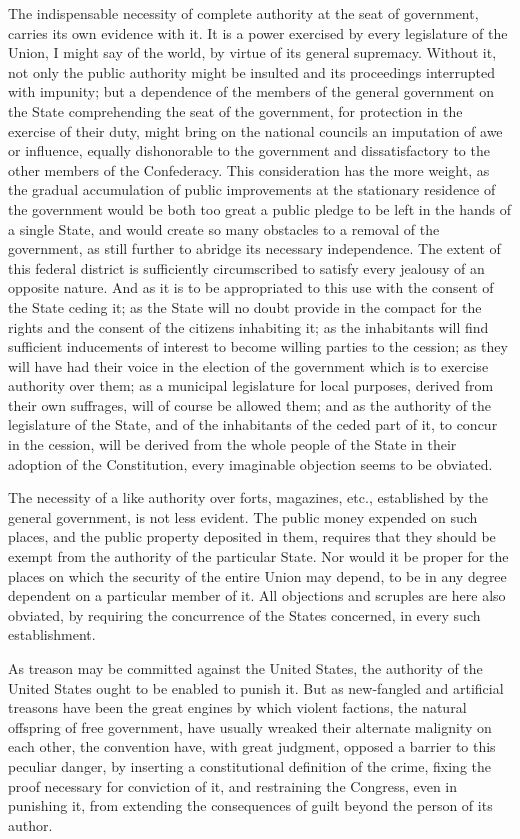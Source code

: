 The indispensable necessity of complete authority at the seat of government, carries its own evidence with it. 
It is a power exercised by every legislature of the Union, I might say of the world, by virtue of its general supremacy. 
Without it, not only the public authority might be insulted and its proceedings interrupted with impunity; but a dependence of the members of the general government on the State comprehending the seat of the government, for protection in the exercise of their duty, might bring on the national councils an imputation of awe or influence, equally dishonorable to the government and dissatisfactory to the other members of the Confederacy. 
This consideration has the more weight, as the gradual accumulation of public improvements at the stationary residence of the government would be both too great a public pledge to be left in the hands of a single State, and would create so many obstacles to a removal of the government, as still further to abridge its necessary independence. 
The extent of this federal district is sufficiently circumscribed to satisfy every jealousy of an opposite nature. 
And as it is to be appropriated to this use with the consent of the State ceding it; as the State will no doubt provide in the compact for the rights and the consent of the citizens inhabiting it; as the inhabitants will find sufficient inducements of interest to become willing parties to the cession; as they will have had their voice in the election of the government which is to exercise authority over them; as a municipal legislature for local purposes, derived from their own suffrages, will of course be allowed them; and as the authority of the legislature of the State, and of the inhabitants of the ceded part of it, to concur in the cession, will be derived from the whole people of the State in their adoption of the Constitution, every imaginable objection seems to be obviated.

The necessity of a like authority over forts, magazines, etc., established by the general government, is not less evident. 
The public money expended on such places, and the public property deposited in them, requires that they should be exempt from the authority of the particular State. 
Nor would it be proper for the places on which the security of the entire Union may depend, to be in any degree dependent on a particular member of it. 
All objections and scruples are here also obviated, by requiring the concurrence of the States concerned, in every such establishment.

As treason may be committed against the United States, the authority of the United States ought to be enabled to punish it. 
But as new-fangled and artificial treasons have been the great engines by which violent factions, the natural offspring of free government, have usually wreaked their alternate malignity on each other, the convention have, with great judgment, opposed a barrier to this peculiar danger, by inserting a constitutional definition of the crime, fixing the proof necessary for conviction of it, and restraining the Congress, even in punishing it, from extending the consequences of guilt beyond the person of its author.

